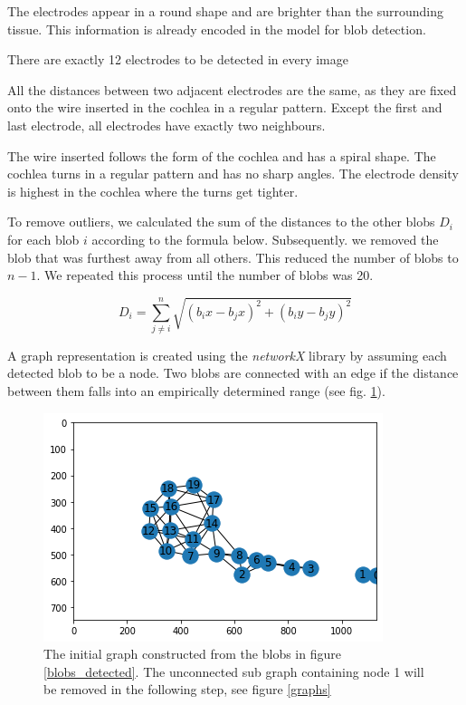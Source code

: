 \documentclass[a4paper, 11pt]{article}
\begin{document}
\begin{description}[] %
\item[Electrode shape and intensity] The electrodes appear in a round shape and are brighter than the surrounding tissue. This information is already encoded in the model for blob detection.
\item[Electrode count] There are exactly 12 electrodes to be detected in every image
\item[Equidistance] All the distances between two adjacent electrodes are the same, as they are fixed onto the wire inserted in the cochlea in a regular pattern. Except the first and last electrode, all electrodes have exactly two neighbours. 
\item[Spiral shape] The wire inserted follows the form of the cochlea and has a spiral shape. The cochlea turns in a regular pattern and has no sharp angles. The electrode density is highest in the cochlea where the turns get tighter.
\end{description}

To remove outliers, we calculated the sum of the distances to the other blobs $D_{i}$ for each blob $i$ according to the formula below. Subsequently. we removed the blob that was furthest away from all others. This reduced the number of blobs to $n-1$. We repeated this process until the number of blobs was 20.

$$D_{i}=\sum_{j\neq i}^{n} \sqrt{(b_ix-b_jx)^2+(b_iy-b_jy)^2}$$

A graph representation is created using the \emph{networkX} library \cite{networkx} by assuming each detected blob to be a node. Two blobs are connected with an edge if the distance between them falls into an empirically determined range (see fig. \ref{network_raw}). %

\begin{figure}[ht]
	\centering
  \includegraphics[width=.5\textwidth]{network_raw.png}
	\caption{The initial graph constructed from the blobs in figure \ref{blobs_detected}. The unconnected sub graph containing node 1 will be removed in the following step, see figure \ref{graphs}}
	\label{network_raw}
\end{figure}
\end{document}
